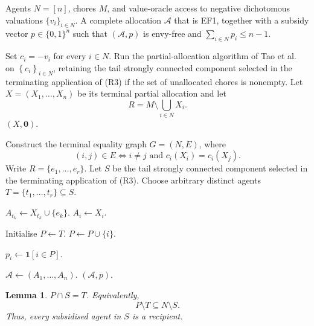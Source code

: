 \documentclass[11pt]{article}
\theoremstyle{plain}
\newtheorem{lemma}{Lemma}
\theoremstyle{plain}
\newcommand{\agents}{N}                       %
\newcommand{\items}{M}                        %
\newcommand{\cost}{c}
\newcommand{\set}[1]{\left\{#1\right\}}
\newcommand{\abs}[1]{\left\lvert#1\right\rvert}
\begin{document}
\begin{algorithm}[H]
\caption{EF1 allocation with at most one unit of subsidy per agent for negative dichotomous valuations}
\label{alg:main}
\begin{algorithmic}[1]
\Require Agents $N=[n]$, chores $M$, and value-oracle access to negative
dichotomous valuations $\{v_i\}_{i\in N}$.
\Ensure A complete allocation $\mathcal{A}$ that is EF1, together with a
subsidy vector $p\in\{0,1\}^n$ such that $(\mathcal{A},p)$ is envy-free and
$\sum_{i\in N}p_i\le n-1$.

\State Set $c_i=-v_i$ for every $i\in N$.
\State Run the partial-allocation algorithm of Tao et al.~\cite{tao2025existence} on $\set{\cost_i}_{i\in\agents}$, retaining the tail strongly connected component selected in the terminating application of  \textnormal{(R3)} if the set of unallocated chores is nonempty.
\State Let $X=(X_1,\dots,X_n)$ be its terminal partial allocation and let
\[
R=\items\setminus\bigcup_{i\in\agents}X_i .
       \]
    \State \Return $(X,\mathbf 0)$.
\EndIf

\State Construct the terminal equality graph $G=(\agents,E)$, where
       \[
       (i,j)\in E
       \iff
       i\neq j
       \text{ and }
       \cost_i(X_i)=\cost_i(X_j).
       \]
\State Write $R=\{e_1,\ldots,e_r\}$.
\State Let $S$ be the tail strongly connected component selected in the
       terminating application of \textnormal{(R3)}.
       \Comment{$r<\abs S$}
\State Choose arbitrary distinct agents
      $T=\{t_1,\ldots,t_r\}\subseteq S$.

    \State $A_{t_k}\gets X_{t_k}\cup\{e_k\}$.
\EndFor
{}
    \State $A_i\gets X_i$.
\EndFor

\State Initialise $P\gets T$.
    \State $P\gets P\cup\{i\}$.
\EndWhile

    \State $p_i\gets \mathbf{1}[i\in P]$.
\EndFor

\State $\mathcal{A}\gets(A_1,\ldots,A_n)$.
\State \Return $(\mathcal{A},p)$.
\end{algorithmic}
\end{algorithm}


\begin{lemma}
\label{lem:m-Pstructure}
$P\cap S=T$. Equivalently,
\[P\setminus T\subseteq \agents\setminus S.
\] Thus, every subsidised agent in $S$ is a recipient.
\end{lemma}
\end{document}
